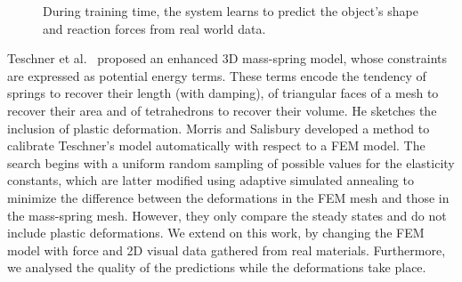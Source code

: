 \documentclass[journal]{IEEEtran}
\begin{document}
\begin{figure}[!t]
\centering
\setlength\fboxsep{0pt}    %
\setlength\fboxrule{0.5pt} %
\caption{During training time, the system learns to predict the object's shape and reaction forces from real world data.}
\label{fig:system}
\end{figure}





Teschner et al.\ \cite{Teschner2004} proposed an enhanced 3D mass-spring model, whose constraints are expressed as potential energy terms.  These terms encode the tendency of springs to recover their length (with damping), of triangular faces of a mesh to recover their area and of tetrahedrons to recover their volume.  He sketches the inclusion of plastic deformation.  Morris and Salisbury \cite{Morris2008} developed a method to calibrate Teschner's model automatically with respect to a FEM model.  The  search begins with a uniform random sampling of possible values for the elasticity constants, which are latter modified using adaptive simulated annealing to minimize the difference between the deformations in the FEM mesh and those in the mass-spring mesh.  However, they only compare the steady states and do not include plastic deformations.  We extend on this work, by changing the FEM model with force and 2D visual data gathered from real materials.  Furthermore, we analysed the quality of the predictions while the deformations take place.
\end{document}
